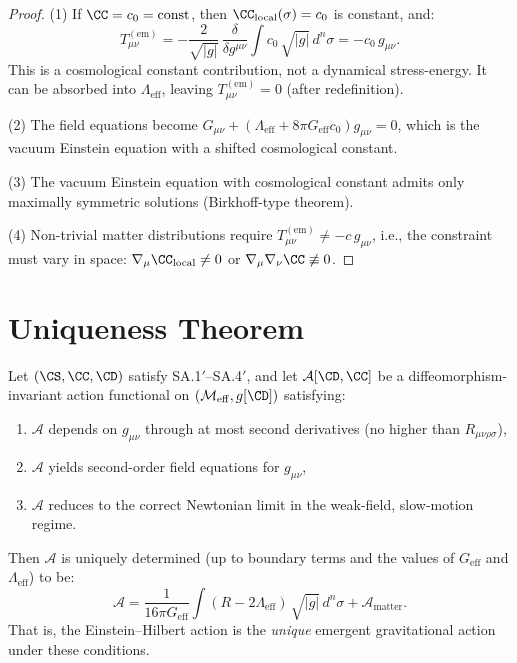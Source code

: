 \begin{proof}
(1) If $\CC = c_0 = \mathrm{const}$, then
$\CC_{\mathrm{local}}(\sigma) = c_0$ is constant, and:
\[
  T_{\mu\nu}^{(\mathrm{em})}
  = -\frac{2}{\sqrt{|g|}}\,\frac{\delta}{\delta g^{\mu\nu}}
  \int c_0\,\sqrt{|g|}\,d^n\sigma
  = -c_0\,g_{\mu\nu}.
\]
This is a cosmological constant contribution, not a dynamical
stress-energy.  It can be absorbed into $\Lambda_{\mathrm{eff}}$,
leaving $T_{\mu\nu}^{(\mathrm{em})} = 0$ (after redefinition).

(2) The field equations become
$G_{\mu\nu} + (\Lambda_{\mathrm{eff}} + 8\pi G_{\mathrm{eff}} c_0)
g_{\mu\nu} = 0$, which is the vacuum Einstein equation with a
shifted cosmological constant.

(3) The vacuum Einstein equation with cosmological constant admits
only maximally symmetric solutions (Birkhoff-type theorem).

(4) Non-trivial matter distributions require
$T_{\mu\nu}^{(\mathrm{em})} \neq -c\,g_{\mu\nu}$, i.e., the
constraint must vary in space:
$\nabla_\mu \CC_{\mathrm{local}} \neq 0$ or
$\nabla_\mu\nabla_\nu \CC \not\equiv 0$.
\end{proof}

\section{Uniqueness Theorem}
\label{sec:ch15:uniqueness}

\begin{theorem}
\label{thm:15.10}
Let $(\CS, \CC, \CD)$ satisfy SA.1$'$--SA.4$'$, and let
$\mathcal{A}[\CD, \CC]$ be a diffeomorphism-invariant action
functional on $(\CM_{\mathrm{eff}}, g[\CD])$ satisfying:
\begin{enumerate}
  \item $\mathcal{A}$ depends on $g_{\mu\nu}$ through at most
        second derivatives (no higher than $R_{\mu\nu\rho\sigma}$),
  \item $\mathcal{A}$ yields second-order field equations for
        $g_{\mu\nu}$,
  \item $\mathcal{A}$ reduces to the correct Newtonian limit in the
        weak-field, slow-motion regime.
\end{enumerate}
Then $\mathcal{A}$ is uniquely determined (up to boundary terms and
the values of $G_{\mathrm{eff}}$ and $\Lambda_{\mathrm{eff}}$) to be:
\begin{equation}\label{eq:unique-action}
  \mathcal{A} = \frac{1}{16\pi G_{\mathrm{eff}}}
  \int (R - 2\Lambda_{\mathrm{eff}})\,\sqrt{|g|}\,d^n\sigma
  + \mathcal{A}_{\mathrm{matter}}.
\end{equation}
That is, the Einstein--Hilbert action is the \emph{unique} emergent
gravitational action under these conditions.
\end{theorem}

